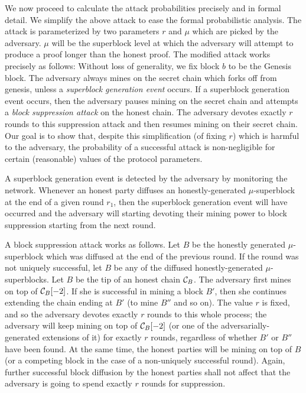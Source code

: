 We now proceed to calculate the attack probabilities precisely and in formal
detail. We simplify the above attack to ease the formal probabilistic analysis.
The attack is parameterized by two parameters $r$ and $\mu$ which are picked by
the adversary. $\mu$ will be the superblock level at which the adversary will
attempt to produce a proof longer than the honest proof. The modified attack
works precisely as follows: Without loss of generality, we fix block $b$ to be
the Genesis block. The adversary always mines on the secret chain which forks
off from genesis, unless a \textit{superblock generation event} occurs. If a
superblock generation event occurs, then the adversary pauses mining on the
secret chain and attempts a \textit{block suppression attack} on the honest
chain. The adversary devotes exactly $r$ rounds to this suppression attack and
then resumes mining on their secret chain. Our goal is to show that, despite
this simplification (of fixing $r$) which is harmful to the adversary, the
probability of a successful attack is non-negligible for certain (reasonable)
values of the protocol parameters.

A superblock generation event is detected by the adversary by monitoring the
network. Whenever an honest party diffuses an honestly-generated
$\mu$-superblock at the end of a given round $r_1$, then the superblock
generation event will have occurred and the adversary will starting devoting
their mining power to block suppression starting from the next round.

A block suppression attack works as follows. Let $B$ be the honestly generated
$\mu$-superblock which was diffused at the end of the previous round. If the
round was not uniquely successful, let $B$ be any of the diffused
honestly-generated $\mu$-superblocks. Let $B$ be the tip of an honest chain
$\mathcal{C}_B$. The adversary first mines on top of $\mathcal{C}_B[-2]$. If she is
successful in mining a block $B'$, then she continues extending the chain ending
at $B'$ (to mine $B''$ and so on). The value $r$ is fixed, and so the adversary
devotes exactly $r$ rounds to this whole process; the adversary will keep mining
on top of $\mathcal{C}_B[-2]$ (or one of the adversarially-generated extensions of
it) for exactly $r$ rounds, regardless of whether $B'$ or $B''$ have been found.
At the same time, the honest parties will be mining on top of $B$ (or a
competing block in the case of a non-uniquely successful round). Again, further
successful block diffusion by the honest parties shall not affect that the
adversary is going to spend exactly $r$ rounds for suppression.

